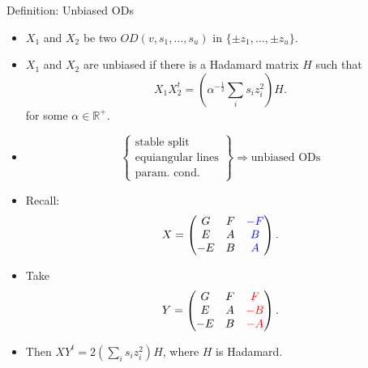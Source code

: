 \documentclass{beamer}
\newcommand{\rred}[1]{\textcolor{red}{#1}}
\newcommand{\bblue}[1]{\textcolor{blue}{#1}}
\begin{document}
\begin{frame}

  \begin{block}{Definition: Unbiased ODs \cite[][]{unbiased-od}}
    \begin{itemize}
    \item $X_1$ and $X_2$ be two $OD(v,s_1, \dots,s_u)$ in $\{\pm z_1, \dots,
      \pm z_u\}$.
    \item $X_1$ and $X_2$ are unbiased if there is a Hadamard matrix $H$ such that
      \[
        X_1X_2^t = \left( \alpha^{-\frac{1}{2}}\sum_i s_iz_i^2 \right)H.
      \]
      for some $\alpha \in \mathbb{R}^+$.
    \end{itemize}
  \end{block}

  \begin{itemize}
  \pause\item
    \[
      \left\{
      \begin{array}{l}
        \text{stable split} \\
        \text{equiangular lines} \\
        \text{param. cond.}
      \end{array} \right\}
      \Rightarrow
      \text{unbiased ODs}
    \]
  \end{itemize}
  
\end{frame}

\begin{frame}

  \begin{itemize}
    \item Recall:
      \[
        X = \begin{pmatrix}
              G & F & \bblue{-F} \\
              E & A & \bblue{B} \\
              -E & B & \bblue{A}
            \end{pmatrix}.
      \]
    \item Take
      \[
        Y = \begin{pmatrix}
              G & F & \rred{F} \\
              E & A & \rred{-B} \\
              -E & B & \rred{-A}
            \end{pmatrix}.
      \]
    \item Then $XY^t = 2\left( \sum_is_iz_i^2 \right)H$, where $H$ is Hadamard.
  \end{itemize}
  
\end{frame}
\end{document}

